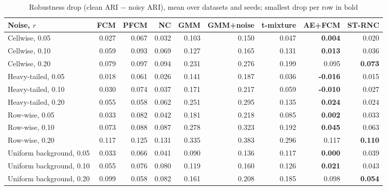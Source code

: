 \begin{table}[t]
\centering
\scriptsize
\setlength{\tabcolsep}{3pt}
\caption{Robustness drop (clean ARI $-$ noisy ARI), mean over datasets and seeds; smallest drop per row in bold}
\label{tab:drop}
\begin{tabular}{lrrrrrrrr}
\toprule
Noise, $r$ & FCM & PFCM & NC & GMM & GMM+noise & t-mixture & AE+FCM & ST-RNC \\
\midrule
Cellwise, 0.05 & 0.027 & 0.067 & 0.032 & 0.103 & 0.150 & 0.047 & \textbf{0.004} & 0.020 \\
Cellwise, 0.10 & 0.059 & 0.093 & 0.069 & 0.127 & 0.165 & 0.131 & \textbf{0.013} & 0.036 \\
Cellwise, 0.20 & 0.079 & 0.097 & 0.094 & 0.231 & 0.276 & 0.199 & 0.095 & \textbf{0.073} \\
Heavy-tailed, 0.05 & 0.018 & 0.061 & 0.026 & 0.141 & 0.187 & 0.036 & \textbf{-0.016} & 0.015 \\
Heavy-tailed, 0.10 & 0.030 & 0.074 & 0.037 & 0.171 & 0.217 & 0.059 & \textbf{-0.010} & 0.027 \\
Heavy-tailed, 0.20 & 0.055 & 0.058 & 0.062 & 0.251 & 0.295 & 0.135 & \textbf{0.024} & 0.024 \\
Row-wise, 0.05 & 0.033 & 0.082 & 0.042 & 0.181 & 0.218 & 0.085 & \textbf{0.002} & 0.033 \\
Row-wise, 0.10 & 0.073 & 0.088 & 0.087 & 0.278 & 0.323 & 0.192 & \textbf{0.045} & 0.063 \\
Row-wise, 0.20 & 0.117 & 0.125 & 0.131 & 0.335 & 0.383 & 0.296 & 0.117 & \textbf{0.110} \\
Uniform background, 0.05 & 0.033 & 0.066 & 0.041 & 0.090 & 0.136 & 0.117 & \textbf{0.000} & 0.039 \\
Uniform background, 0.10 & 0.055 & 0.076 & 0.080 & 0.119 & 0.160 & 0.126 & \textbf{0.021} & 0.043 \\
Uniform background, 0.20 & 0.099 & 0.058 & 0.082 & 0.161 & 0.208 & 0.185 & 0.098 & \textbf{0.054} \\
\bottomrule
\end{tabular}
\end{table}
